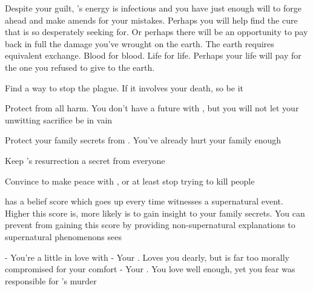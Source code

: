 \documentclass[char]{guildcamp4}
\begin{document}
Despite your guilt, \cOutsider{}'s energy is infectious and you have just enough will to forge ahead and make amends for your mistakes. Perhaps you will help find the cure that \cOutsider{} is so desperately seeking for. Or perhaps there will be an opportunity to pay back in full the damage you've wrought on the earth. The earth requires equivalent exchange. Blood for blood. Life for life. Perhaps your life will pay for the one you refused to give to the earth.  

\begin{itemz}[Goals]
	\item Find a way to stop the plague. If it involves your death, so be it
	\item Protect \cOutsider{} from all harm. You don't have a future with \cOutsider{\them}, but you will not let your unwitting sacrifice be in vain
	\item Protect your family secrets from \cOutsider{}. You've already hurt your family enough
	\item Keep \cOutsider{}'s resurrection a secret from everyone
	\item Convince \cApprentice{} to make peace with \cOutsider{}, or at least stop trying to kill people
\end{itemz}

\begin{itemz}[Notes]
	\item \cOutsider{} has a belief score which goes up every time \cOutsider{\they} witnesses a supernatural event. Higher this score is, more likely \cOutsider{\they} is to gain insight to your family secrets. You can prevent \cOutsider{\them} from gaining this score by providing non-supernatural explanations to supernatural phenomenons \cOutsider{\they} sees 
\end{itemz}

\begin{contacts}
	\contact{\cOutsider{}} - You're a little in love with \cOutsider{\them}
	\contact{\cElder{}} - Your \cElder{\parent}. Loves you dearly, but is far too morally compromised for your comfort
	\contact{\cApprentice{}} - Your \cApprentice{\sibling}. You love \cApprentice{\them} well enough, yet you fear \cApprentice{\they} was responsible for \cOutsider{}'s murder
\end{contacts}
\end{document}
